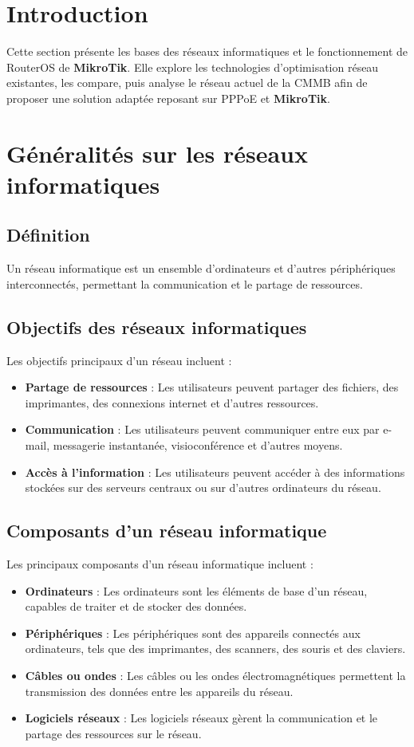 {}
\section*{Introduction}
Cette section présente les bases des réseaux informatiques et le fonctionnement de \gls{RouterOS} de \textbf{MikroTik}. Elle explore les technologies d’optimisation réseau existantes, les compare, puis analyse le réseau actuel de la \gls{CMMB} afin de proposer une solution adaptée reposant sur \gls{PPPoE} et \textbf{MikroTik}.
\section{ Généralités sur les réseaux informatiques \cite{reseaux-info}  }
\subsection{Définition }
Un réseau informatique est un ensemble d'ordinateurs et d'autres périphériques 
interconnectés, permettant la communication et le partage de ressources.  
\subsection{Objectifs des réseaux informatiques}
Les objectifs principaux d'un réseau incluent :  
\begin{itemize}
    \item \textbf{Partage de ressources} : Les utilisateurs peuvent partager des fichiers, des imprimantes, des connexions internet et d'autres ressources.
    \item \textbf{Communication} : Les utilisateurs peuvent communiquer entre eux par e-mail, messagerie instantanée, visioconférence et d'autres moyens.
    \item \textbf{Accès à l’information} : Les utilisateurs peuvent accéder à des informations stockées sur des serveurs centraux ou sur d'autres ordinateurs du réseau.
\end{itemize}

\subsection{Composants d’un réseau informatique}
Les principaux composants d'un réseau informatique incluent :  
\begin{itemize}
    \item \textbf{Ordinateurs} : Les ordinateurs sont les éléments de base d'un réseau, capables de traiter et de stocker des données.
    \item \textbf{Périphériques} : Les périphériques sont des appareils connectés aux ordinateurs, tels que des imprimantes, des scanners, des souris et des claviers.
    \item \textbf{Câbles ou ondes} : Les câbles ou les ondes électromagnétiques permettent la transmission des données entre les appareils du réseau.
    \item \textbf{Logiciels réseaux} : Les logiciels réseaux gèrent la communication et le partage des ressources sur le réseau.
\end{itemize}
